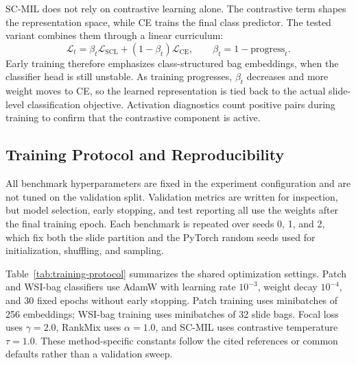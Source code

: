 \documentclass[11pt]{article}
\begin{document}
SC-MIL does not rely on contrastive learning alone. The contrastive term shapes the representation space, while CE trains the final class predictor. The tested variant combines them through a linear curriculum:
\begin{equation}
  \mathcal{L}_t =
  \beta_t\mathcal{L}_{\mathrm{SCL}} +
  (1-\beta_t)\mathcal{L}_{\mathrm{CE}},
  \qquad
  \beta_t = 1-\mathrm{progress}_t.
  \label{eq:scmil}
\end{equation}
\noindent Early training therefore emphasizes class-structured bag embeddings, when the classifier head is still unstable. As training progresses, $\beta_t$ decreases and more weight moves to CE, so the learned representation is tied back to the actual slide-level classification objective. Activation diagnostics count positive pairs during training to confirm that the contrastive component is active.

\subsection{Training Protocol and Reproducibility}
\label{sec:training-protocol}
All benchmark hyperparameters are fixed in the experiment configuration and are not tuned on the validation split. Validation metrics are written for inspection, but model selection, early stopping, and test reporting all use the weights after the final training epoch. Each benchmark is repeated over seeds 0, 1, and 2, which fix both the slide partition and the PyTorch random seeds used for initialization, shuffling, and sampling.

Table~\ref{tab:training-protocol} summarizes the shared optimization settings. Patch and WSI-bag classifiers use AdamW with learning rate $10^{-3}$, weight decay $10^{-4}$, and 30 fixed epochs without early stopping. Patch training uses minibatches of 256 embeddings; WSI-bag training uses minibatches of 32 slide bags. Focal loss uses $\gamma=2.0$, RankMix uses $\alpha=1.0$, and SC-MIL uses contrastive temperature $\tau=1.0$. These method-specific constants follow the cited references or common defaults rather than a validation sweep.
\end{document}
